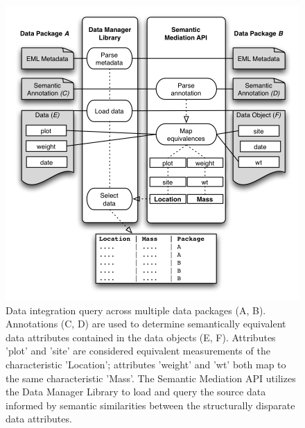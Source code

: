 \begin{figure}
\centering
\includegraphics[scale=1.0]{images/integration.png}
\caption{Data integration query across multiple data packages (A, B).  Annotations (C, D) are used to determine semantically equivalent data attributes contained in the data objects (E, F). Attributes 'plot' and 'site' are considered equivalent measurements of the characteristic 'Location'; attributes 'weight' and 'wt' both map to the same characteristic 'Mass'. The Semantic Mediation API utilizes the Data Manager Library to load and query the source data informed by semantic similarities between the structurally disparate data attributes.}
\label{fig:integration}
\end{figure}

